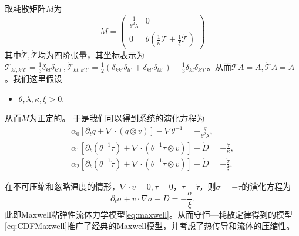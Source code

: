 	取耗散矩阵$M$为
	\begin{equation*}
		M = \left( \begin{array}{ccc} 
			\frac{1}{\theta^2 \lambda} & 0 \\
			0 &  \theta(\frac{1}{\kappa} \dot{\mathcal{T}} + \frac{1}{\xi} \mathring{\mathcal{T}})  
		\end{array} \right)
	\end{equation*}
	其中$\dot{\mathcal{T}}, \mathring{\mathcal{T}}$均为四阶张量，其坐标表示为$\dot{\mathcal{T}}_{kl,k'l'} = \frac{1}{3}\delta_{kl} \delta_{k'l'}, \mathring{\mathcal{T}}_{kl,k'l'} =\frac{1}{2}(\delta_{kk'}\delta_{ll'} + \delta_{kl'} \delta_{lk'} ) -\frac{1}{3}\delta_{kl} \delta_{k'l'} $。从而$\dot{\mathcal{T}} A = \dot{A},\mathring{\mathcal{T}} A = \mathring{A}$。我们这里假设
	\begin{itemize}
		\item $\theta,\lambda,\kappa,\xi > 0$.
	\end{itemize}
	从而$M$为正定的。
	于是我们可以得到系统的演化方程为\cite{zhu2014conservation}
	\begin{subequations}\label{eq:CDFMaxwell}
		\begin{align}
			\alpha_0 [\partial_t q +  \nabla \cdot (q \otimes v)] - \nabla \theta^{-1} = -\frac{q}{\theta^2 \lambda}, \\
			\alpha_1[\partial_t (\theta^{-1} \dot{\tau}) + \nabla \cdot (\theta^{-1} \dot{\tau} \otimes v)] + \dot{D} = -\frac{\dot{\tau}}{\kappa}, \\
			\alpha_2[\partial_t (\theta^{-1} \mathring{\tau}) + \nabla \cdot (\theta^{-1} \mathring{\tau} \otimes v)] + \mathring{D} = -\frac{\mathring{\tau}}{\xi}. 
		\end{align}
	\end{subequations}


	在不可压缩和忽略温度的情形，$\nabla \cdot v = 0, \dot{\tau}=0$，$\tau = \mathring{\tau}$，则$\sigma = -\tau$的演化方程为
	\begin{equation*}
		\partial_t \sigma + v \cdot \nabla \sigma - D = -\frac{\sigma}{\xi}. 
	\end{equation*}
	此即Maxwell粘弹性流体力学模型\eqref{eq:maxwell}。从而守恒—耗散定律得到的模型\eqref{eq:CDFMaxwell}推广了经典的Maxwell模型，并考虑了热传导和流体的压缩性。	

